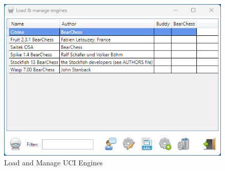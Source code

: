 \documentclass[11pt,a4paper]{article}
\begin{document}
	\begin{figure}[H]
		\centering
		\includegraphics[scale=0.8]{LoadManageEngine1.png}
		\caption{Load and Manage UCI Engines}
		\label{fig:LoadManageEngine1}
	\end{figure}
	
\end{document}
